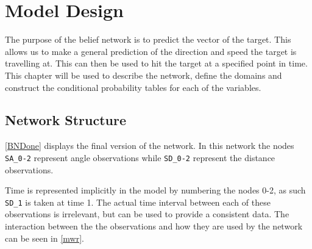 \chapter{Model Design}\label{BNModel}

The purpose of the belief network is to predict the vector of the
target. This allows us to make a general prediction of the direction and speed
the target is travelling at. This can then be used to hit the target at a
specified point in time. This chapter will be used to describe the network,
define the domains and construct the conditional probability tables for each of
the variables.

\section{Network Structure}
\autoref{BNDone} displays the final version of the network. In this network the
nodes \texttt{SA\_0-2} represent angle observations while \texttt{SD\_0-2}
represent the distance observations.


Time is represented implicitly in the model by numbering the nodes 0-2, as such
\texttt{SD\_1} is taken at time 1. The actual time interval between each of
these observations is irrelevant, but can be used to provide a consistent data.
The interaction between the the observations and how they are used by the
network can be seen in \autoref{mwr}.


